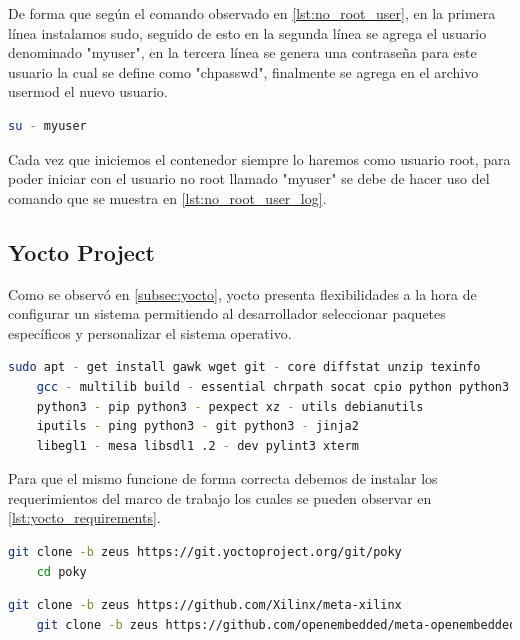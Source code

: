 De forma que según el comando observado en \ref{lst:no_root_user}, en la primera línea instalamos sudo, seguido de esto en la segunda línea se agrega el usuario denominado "myuser", en la tercera línea se genera una contraseña para este usuario la cual se define como "chpasswd", finalmente se agrega en el archivo usermod el nuevo usuario. 

\begin{lstlisting}[language=bash, caption={Iniciar usuario no root}, label=lst:no_root_user_log]
    su - myuser
\end{lstlisting}


Cada vez que iniciemos el contenedor siempre lo haremos como usuario root, para poder iniciar con el usuario no root llamado "myuser" se debe de hacer uso del comando que se muestra en \ref{lst:no_root_user_log}.

\subsection{Yocto Project}

Como se observó en \ref{subsec:yocto}, yocto presenta flexibilidades a la hora de configurar un sistema permitiendo al desarrollador seleccionar paquetes específicos y personalizar el sistema operativo.

\begin{lstlisting}[language=bash, caption={Requerimientos Yocto Zeus}, label=lst:yocto_requirements]
    sudo apt - get install gawk wget git - core diffstat unzip texinfo
    gcc - multilib build - essential chrpath socat cpio python python3
    python3 - pip python3 - pexpect xz - utils debianutils 
    iputils - ping python3 - git python3 - jinja2 
    libegl1 - mesa libsdl1 .2 - dev pylint3 xterm
\end{lstlisting}

Para que el mismo funcione de forma correcta debemos de instalar los requerimientos del marco de trabajo los cuales se pueden observar en \ref{lst:yocto_requirements}.

\begin{lstlisting}[language=bash, caption={Version de Yocto}, label=lst:yocto_clone]
    git clone -b zeus https://git.yoctoproject.org/git/poky
    cd poky
\end{lstlisting}

\begin{lstlisting}[language=bash, caption={BSP para Zedboard}, label=lst:yocto_zedboard]
    git clone -b zeus https://github.com/Xilinx/meta-xilinx
    git clone -b zeus https://github.com/openembedded/meta-openembedded.git
\end{lstlisting}

